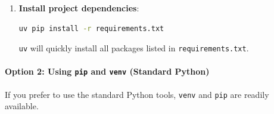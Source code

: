 \documentclass[12pt,a4paper]{article}
\begin{document}
\begin{enumerate}
\begin{itemize}
    \textbf{On Windows (PowerShell)}:

\end{itemize}

    Your command prompt should now show \texttt{(.venv)} prefixed, indicating the virtual environment is active.

    \item 
    \textbf{Install project dependencies}:

    \begin{lstlisting}[language=bash]
uv pip install -r requirements.txt
\end{lstlisting}

    \texttt{uv} will quickly install all packages listed in \texttt{requirements.txt}.

\end{enumerate}

\paragraph{Option 2: Using \texttt{pip} and \texttt{venv} (Standard Python)}

If you prefer to use the standard Python tools, \texttt{venv} and \texttt{pip} are readily available.
\end{document}
